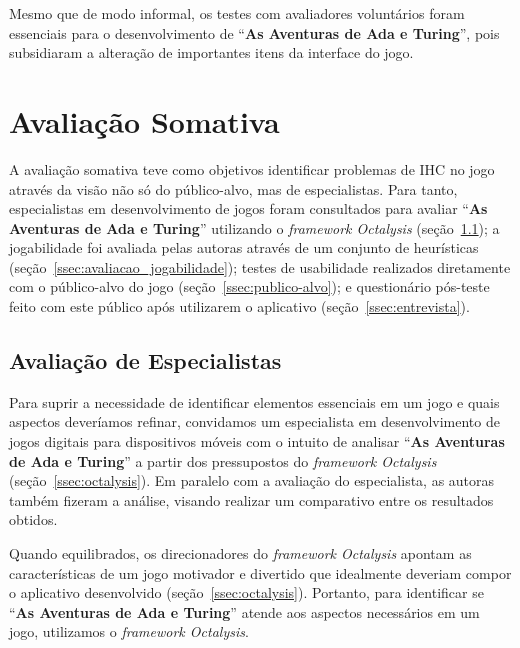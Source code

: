 
Mesmo que de modo informal, os testes com avaliadores voluntários foram essenciais para o desenvolvimento de “\textbf{As Aventuras de Ada e Turing}”, pois subsidiaram a alteração de importantes itens da interface do jogo.

\section{Avaliação Somativa} \label{sec:somativa}

A avaliação somativa teve como objetivos identificar problemas de \acrshort{IHC} no jogo através da visão não só do público-alvo, mas de especialistas. Para tanto, especialistas em desenvolvimento de jogos foram consultados para avaliar “\textbf{As Aventuras de Ada e Turing}” utilizando o \textit{framework Octalysis} (seção~\ref{ssec:especialistas}); a jogabilidade foi avaliada pelas autoras através de um conjunto de heurísticas (seção~\ref{ssec:avaliacao_jogabilidade}); testes de usabilidade realizados diretamente com o público-alvo do jogo (seção~\ref{ssec:publico-alvo}); e questionário pós-teste feito com este público após utilizarem o aplicativo (seção~\ref{ssec:entrevista}).
\subsection{Avaliação de Especialistas} \label{ssec:especialistas}

Para suprir a necessidade de identificar elementos essenciais em um jogo e quais aspectos deveríamos refinar, convidamos um especialista em desenvolvimento de jogos digitais para dispositivos móveis com o intuito de analisar “\textbf{As Aventuras de Ada e Turing}” a partir dos pressupostos do \textit{framework Octalysis} (seção~\ref{ssec:octalysis}). Em paralelo com a avaliação do especialista, as autoras também fizeram a análise, visando realizar um comparativo entre os resultados obtidos.

Quando equilibrados, os direcionadores do \textit{framework Octalysis} apontam as características de um jogo motivador e divertido que idealmente deveriam compor o aplicativo desenvolvido (seção~\ref{ssec:octalysis}).  Portanto, para identificar se “\textbf{As Aventuras de Ada e Turing}” atende aos aspectos necessários em um jogo, utilizamos o \textit{framework Octalysis}.

